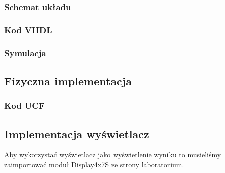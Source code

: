 \documentclass[a4paper,12pt]{extarticle}  %
\begin{document}
\subsubsection{Schemat układu}
\begin{figure}[H]
	\centering
\end{figure}
\subsubsection{Kod VHDL}

\subsubsection{Symulacja}
\begin{figure}[H]
	\centering
\end{figure}
\subsection{Fizyczna implementacja}
\subsubsection{Kod UCF}

\subsection{Implementacja wyświetlacz}
Aby wykorzystać wyświetlacz jako wyświetlenie wyniku to musieliśmy zaimportować moduł Display4x7S ze strony laboratorium.
\end{document}
